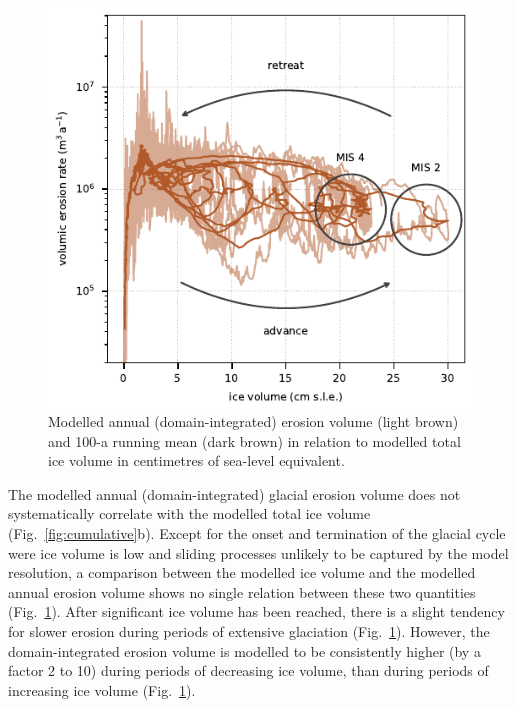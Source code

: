 \documentclass[esurf, manuscript]{copernicus}
\begin{document}
    \begin{figure}[ht]
      \centerline{\includegraphics{alpero_evolution}}
      \caption{%
        Modelled annual (domain-integrated) erosion volume (light brown) and 100-a
        running mean (dark brown) in relation to modelled total ice volume in
        centimetres of sea-level equivalent.}
      \label{fig:evolution}
    \end{figure}

    The modelled annual (domain-integrated) glacial erosion volume
    does not systematically correlate with the modelled total ice volume
    (Fig.~\ref{fig:cumulative}b). Except for the onset and termination of the
    glacial cycle were ice volume is low and sliding processes unlikely to be
    captured by the model resolution, a comparison between the modelled ice
    volume and the modelled annual erosion volume shows no single relation
    between these two quantities (Fig.~\ref{fig:evolution}). After significant
    ice volume has been reached, there is a slight tendency for slower erosion
    during periods of extensive glaciation (Fig.~\ref{fig:evolution}). However,
    the domain-integrated erosion volume is modelled to be consistently higher
    (by a factor 2 to 10) during periods of decreasing ice volume, than during
    periods of increasing ice volume (Fig.~\ref{fig:evolution}).

\end{document}
